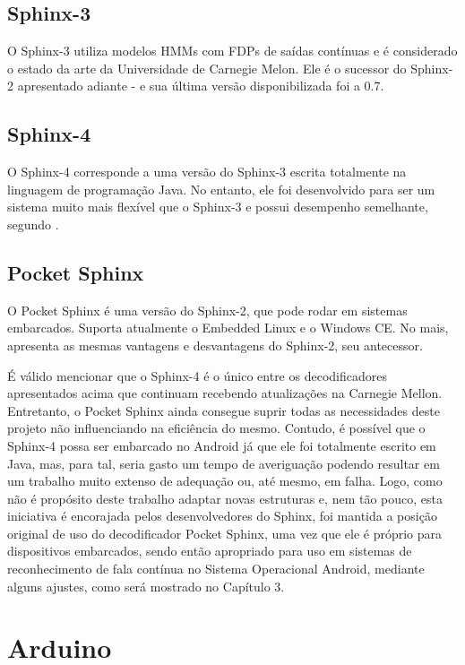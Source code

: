 \documentclass[12pt,a4paper,oneside]{report}
\begin{document}
\subsection{Sphinx-3}

O Sphinx-3 utiliza modelos HMMs com FDPs de saídas contínuas e é considerado o estado da arte da Universidade de Carnegie Melon. Ele é o sucessor do Sphinx-2 apresentado adiante - e sua última versão disponibilizada foi a 0.7.

\subsection{Sphinx-4}

O Sphinx-4 \cite{sgtriwiguiboh} corresponde a uma versão do Sphinx-3 escrita totalmente na linguagem de programação Java. No entanto, ele foi desenvolvido para ser um sistema muito mais flexível que o Sphinx-3 e possui desempenho semelhante, segundo \cite{sgtriwiguiboh}.

\subsection{Pocket Sphinx}

O Pocket Sphinx é uma versão do Sphinx-2, que pode rodar em sistemas embarcados. Suporta atualmente o Embedded Linux e o Windows CE. No mais, apresenta as mesmas vantagens e desvantagens do Sphinx-2, seu antecessor.

É válido mencionar que o Sphinx-4 é o único entre os decodificadores apresentados acima que continuam recebendo atualizações na Carnegie Mellon. Entretanto, o Pocket Sphinx ainda consegue suprir todas as necessidades deste projeto não influenciando na eficiência do mesmo. Contudo, é possível que o Sphinx-4 possa ser embarcado no Android já que ele foi totalmente escrito em Java, mas, para tal, seria gasto um tempo de averiguação podendo resultar em um trabalho muito extenso de adequação ou, até mesmo, em falha. Logo, como não é propósito deste trabalho adaptar novas estruturas e, nem tão pouco, esta iniciativa é encorajada pelos desenvolvedores do Sphinx, foi mantida a posição original de uso do decodificador Pocket Sphinx, uma vez que ele é próprio para dispositivos embarcados, sendo então apropriado para uso em sistemas de reconhecimento de fala contínua no Sistema Operacional Android, mediante alguns ajustes, como será mostrado no Capítulo 3.

%
%
\section{Arduino}
\end{document}
